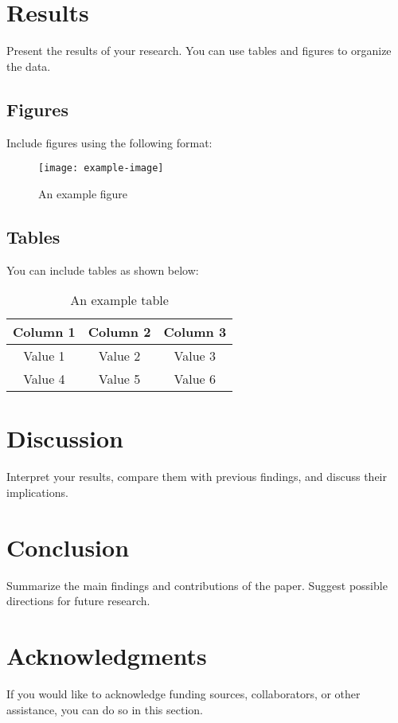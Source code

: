 \documentclass[11pt]{article}
\begin{document}
\section{Results}
Present the results of your research. You can use tables and figures to organize the data.

\subsection{Figures}
Include figures using the following format:
\begin{figure}[h]
    \centering
    \texttt{[image: example-image]}
    \caption{An example figure}
    \label{fig:example}
\end{figure}

\subsection{Tables}
You can include tables as shown below:
\begin{table}[h]
    \centering
    \begin{tabular}{|c|c|c|}
        \hline
        Column 1 & Column 2 & Column 3 \\
        \hline
        Value 1 & Value 2 & Value 3 \\
        Value 4 & Value 5 & Value 6 \\
        \hline
    \end{tabular}
    \caption{An example table}
    \label{tab:example}
\end{table}

\section{Discussion}
Interpret your results, compare them with previous findings, and discuss their implications. 

\section{Conclusion}
Summarize the main findings and contributions of the paper. Suggest possible directions for future research.

\section*{Acknowledgments}
If you would like to acknowledge funding sources, collaborators, or other assistance, you can do so in this section.



\end{document}
